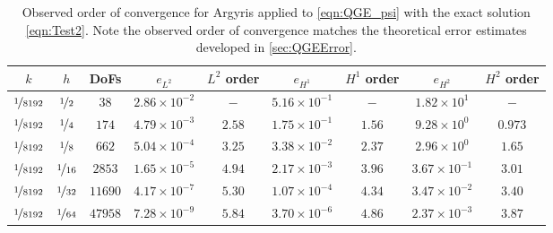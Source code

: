 \begin{table}
\begin{center}
  \begin{tabular}{|c|c|c|c|c|c|c|c|c|}
    \hline
    $k$ & $h$ & DoFs & $e_{L^2}$ & $L^2$ order & $e_{H^1}$ & $H^1$ order & $e_{H^2}$ & $H^2$ order \\
    \hline
    $\nicefrac{1}{8192}$ & $\nicefrac{1}{2}$ & $38$ & $2.86\times 10^{-2}$ & $-$ & $5.16\times 10^{-1}$ & $-$ & $1.82\times 10^{1}$ & $-$ \\
    $\nicefrac{1}{8192}$ & $\nicefrac{1}{4}$ & $174$ & $4.79\times 10^{-3}$ & $2.58$ & $1.75\times 10^{-1}$ & $1.56$ & $9.28\times 10^0$ & $0.973$\\
    $\nicefrac{1}{8192}$ & $\nicefrac{1}{8}$ & $662$ & $5.04\times 10^{-4}$ & $3.25$ & $3.38\times 10^{-2}$ & $2.37$ & $2.96\times 10^0$ & $1.65$\\
    $\nicefrac{1}{8192}$ & $\nicefrac{1}{16}$ & $2853$ & $1.65\times 10^{-5}$ & $4.94$ & $2.17\times 10^{-3}$ & $3.96$ & $3.67\times 10^{-1}$ & $3.01$\\
    $\nicefrac{1}{8192}$ & $\nicefrac{1}{32}$ & $11690$ & $4.17\times 10^{-7}$ & $5.30$ & $1.07\times 10^{-4}$ & $4.34$ & $3.47\times 10^{-2}$ & $3.40$\\
    $\nicefrac{1}{8192}$ &  $\nicefrac{1}{64}$ & $47958$ & $7.28\times 10^{-9}$ & $5.84$ & $3.70\times 10^{-6}$ & $4.86$ & $2.37\times 10^{-3}$ & $3.87$ \\
    \hline
  \end{tabular}
\end{center}
  \caption{Observed order of convergence for Argyris applied to
    \eqref{eqn:QGE_psi} with the exact solution \eqref{eqn:Test2}. Note the observed
    order of convergence matches the theoretical error estimates developed in
    \autoref{sec:QGEError}.}
    \label{tab:Test2Space}
\end{table}

